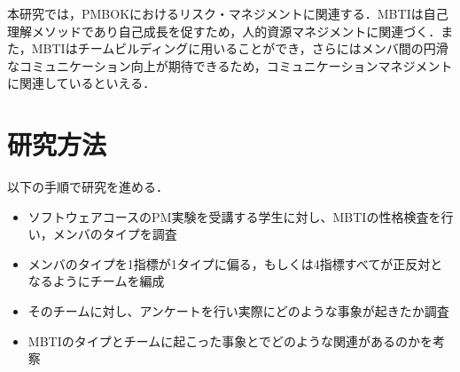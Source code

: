 \documentclass[uplatex,twocolumn,dvipdfmx]{jsarticle}
\begin{document}
本研究では，PMBOKにおけるリスク・マネジメントに関連する．MBTIは自己理解メソッドであり自己成長を促すため，人的資源マネジメントに関連づく．また，MBTIはチームビルディングに用いることができ，さらにはメンバ間の円滑なコミュニケーション向上が期待できるため，コミュニケーションマネジメントに関連しているといえる．

\section{研究方法}

以下の手順で研究を進める．
\begin{itemize}
 \item ソフトウェアコースのPM実験を受講する学生に対し、MBTIの性格検査を行い，メンバのタイプを調査
 \item メンバのタイプを1指標が1タイプに偏る，もしくは4指標すべてが正反対となるようにチームを編成
 \item そのチームに対し、アンケートを行い実際にどのような事象が起きたか調査
 \item MBTIのタイプとチームに起こった事象とでどのような関連があるのかを考察
\end{itemize}
\nocite{BB19543658}\nocite{110003745117}\nocite{ylab2015}\nocite{katolab2015}



\end{document}

